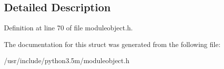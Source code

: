 \subsection{Detailed Description}


Definition at line 70 of file moduleobject.\+h.



The documentation for this struct was generated from the following file\+:\begin{DoxyCompactItemize}
\item 
/usr/include/python3.\+5m/moduleobject.\+h\end{DoxyCompactItemize}
